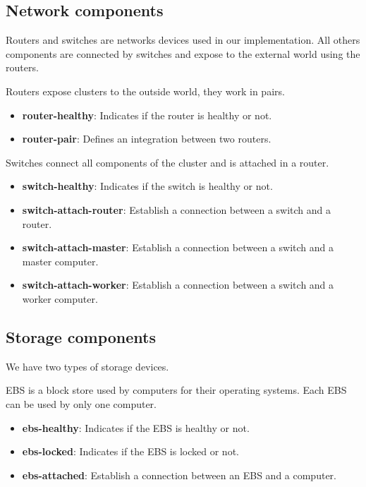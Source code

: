 \documentclass[letterpaper]{article}
\begin{document}
\subsection{Network components}\label{sec:implementation2}

Routers and switches are networks devices used in our implementation. All others components are connected by switches and expose to the external world using the routers.

Routers expose clusters to the outside world, they work in pairs.

\begin{itemize}
    \item \textbf{router-healthy}: Indicates if the router is healthy or not.
    \item \textbf{router-pair}: Defines an integration between two routers.
\end{itemize}

Switches connect all components of the cluster and is attached in a router.

\begin{itemize}
    \item \textbf{switch-healthy}: Indicates if the switch is healthy or not.
    \item \textbf{switch-attach-router}: Establish a connection between a switch and a router.
    \item \textbf{switch-attach-master}: Establish a connection between a switch and a master computer.
    \item \textbf{switch-attach-worker}: Establish a connection between a switch and a worker computer.
\end{itemize}

\subsection{Storage components}\label{sec:implementation3}

We have two types of storage devices.

EBS is a block store used by computers for their operating systems. Each EBS can be used by only one computer.

\begin{itemize}
    \item \textbf{ebs-healthy}: Indicates if the EBS is healthy or not.
    \item \textbf{ebs-locked}: Indicates if the EBS is locked or not.
    \item \textbf{ebs-attached}: Establish a connection between an EBS and a computer.
\end{itemize}
\end{document}
